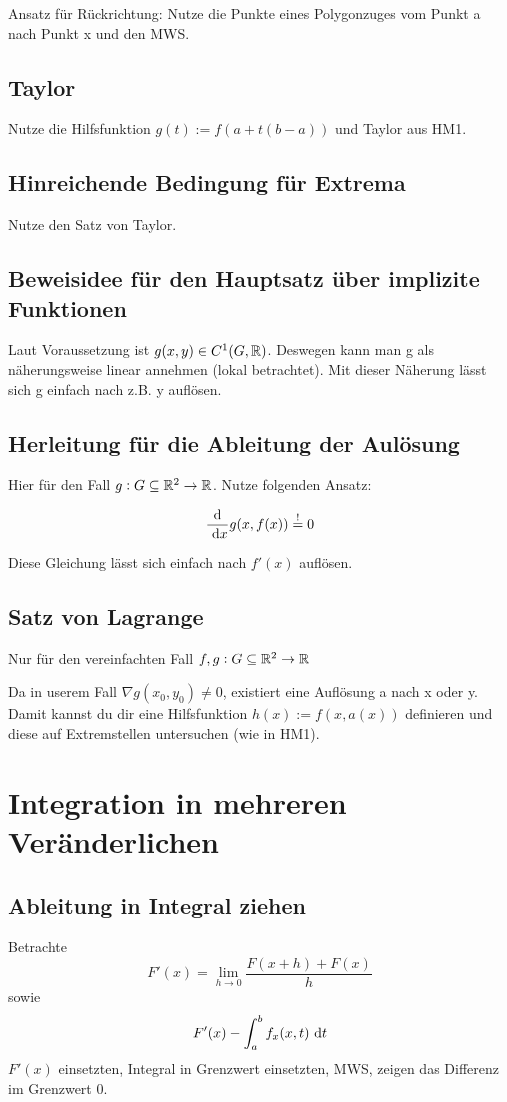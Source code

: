 Ansatz für Rückrichtung: Nutze die Punkte eines Polygonzuges vom Punkt a nach
Punkt x und den MWS.

\subsection{Taylor}
Nutze die Hilfsfunktion $g(t):=f(a+t(b-a))$ und Taylor aus HM1.

\subsection{Hinreichende Bedingung für Extrema}
Nutze den Satz von Taylor.

\subsection{Beweisidee für den Hauptsatz über implizite Funktionen}
Laut Voraussetzung ist $g(x,y) \in C^1(G,\mathbb{R})$. Deswegen kann man g als näherungsweise
linear annehmen (lokal betrachtet). Mit dieser Näherung lässt sich g einfach nach
z.B. y auflösen.

\subsection{Herleitung für die Ableitung der Aulösung}
Hier für den Fall $g:G\subseteq \mathbb{R}^{2} \rightarrow \mathbb{R}$. Nutze folgenden Ansatz:

\begin{equation*}
    \frac{\text{d}}{\text{ d}x}g(x,f(x)) \stackrel{!}{=} 0
\end{equation*}

Diese Gleichung lässt sich einfach nach $f'(x)$ auflösen.

\subsection{Satz von Lagrange}
Nur für den vereinfachten Fall $f,g:G \subseteq \mathbb{R}^{2} \rightarrow \mathbb{R}$

Da in userem Fall $\nabla g(x_0,y_0) \neq 0$, existiert eine Auflösung a nach x oder
y. Damit kannst du dir eine Hilfsfunktion $h(x):=f(x,a(x))$ definieren und diese
auf Extremstellen untersuchen (wie in HM1).


 \section{Integration in mehreren Veränderlichen}
 \subsection{Ableitung in Integral ziehen}
 Betrachte
 \begin{equation*}
     F'(x) = \lim_{h \to 0} \frac{F(x + h) + F(x)}{h}
 \end{equation*}
 sowie
 \begin{equation*}
     F'(x) - \int_a^b f_x(x,t) \text{ d}t
 \end{equation*}
 $F'(x)$ einsetzten, Integral in Grenzwert einsetzten, MWS,
 zeigen das Differenz im Grenzwert $0$.
